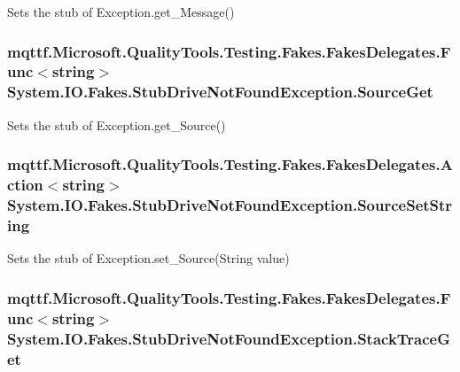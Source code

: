 Sets the stub of Exception.\-get\-\_\-\-Message()

\hypertarget{class_system_1_1_i_o_1_1_fakes_1_1_stub_drive_not_found_exception_aa7f8f1550a34d80ba5c89be94d741dc5}{
\subsubsection[{Source\-Get}]{\setlength{\rightskip}{0pt plus 5cm}mqttf.\-Microsoft.\-Quality\-Tools.\-Testing.\-Fakes.\-Fakes\-Delegates.\-Func$<$string$>$ System.\-I\-O.\-Fakes.\-Stub\-Drive\-Not\-Found\-Exception.\-Source\-Get}}\label{class_system_1_1_i_o_1_1_fakes_1_1_stub_drive_not_found_exception_aa7f8f1550a34d80ba5c89be94d741dc5}


Sets the stub of Exception.\-get\-\_\-\-Source()

\hypertarget{class_system_1_1_i_o_1_1_fakes_1_1_stub_drive_not_found_exception_aec661738d7e6e62dde25f00e1a884c0e}{
\subsubsection[{Source\-Set\-String}]{\setlength{\rightskip}{0pt plus 5cm}mqttf.\-Microsoft.\-Quality\-Tools.\-Testing.\-Fakes.\-Fakes\-Delegates.\-Action$<$string$>$ System.\-I\-O.\-Fakes.\-Stub\-Drive\-Not\-Found\-Exception.\-Source\-Set\-String}}\label{class_system_1_1_i_o_1_1_fakes_1_1_stub_drive_not_found_exception_aec661738d7e6e62dde25f00e1a884c0e}


Sets the stub of Exception.\-set\-\_\-\-Source(\-String value)

\hypertarget{class_system_1_1_i_o_1_1_fakes_1_1_stub_drive_not_found_exception_a3dbade6f0d432feba6b6358c5a8995b1}{
\subsubsection[{Stack\-Trace\-Get}]{\setlength{\rightskip}{0pt plus 5cm}mqttf.\-Microsoft.\-Quality\-Tools.\-Testing.\-Fakes.\-Fakes\-Delegates.\-Func$<$string$>$ System.\-I\-O.\-Fakes.\-Stub\-Drive\-Not\-Found\-Exception.\-Stack\-Trace\-Get}}\label{class_system_1_1_i_o_1_1_fakes_1_1_stub_drive_not_found_exception_a3dbade6f0d432feba6b6358c5a8995b1}


